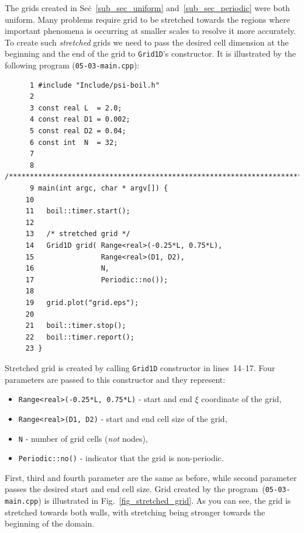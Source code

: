 The grids created in Sec\.~\ref{sub_sec_uniform} and~\ref{sub_sec_periodic}
were both uniform. Many problems require grid to be stretched towards
the regions where important phenomena is occurring at smaller scales to
resolve it more accurately. To create such {\em stretched} grids we need
to pass the desired cell dimension at the beginning and the end of the grid
to {\tt Grid1D}'s constructor. It is illustrated by the following program 
({\tt 05-03-main.cpp}):
%
{\small \begin{verbatim}
      1 #include "Include/psi-boil.h"
      2
      3 const real L  = 2.0;
      4 const real D1 = 0.002;
      5 const real D2 = 0.04;
      6 const int  N  = 32;
      7
      8 /****************************************************************************/
      9 main(int argc, char * argv[]) {
     10
     11   boil::timer.start();
     12
     13   /* stretched grid */
     14   Grid1D grid( Range<real>(-0.25*L, 0.75*L),
     15                Range<real>(D1, D2),
     16                N,
     17                Periodic::no());
     18
     19   grid.plot("grid.eps");
     20
     21   boil::timer.stop();
     22   boil::timer.report();
     23 }
\end{verbatim}}
%
Stretched grid is created by calling {\tt Grid1D} constructor in lines~14--17. 
Four parameters are passed to this constructor and they represent:
%
\begin{itemize}
  \item {\tt Range<real>(-0.25*L, 0.75*L)} - start and end $\xi$ coordinate of the grid,
  \item {\tt Range<real>(D1, D2)}          - start and end cell size of the grid,
  \item {\tt N}                            - number of grid cells ({\em not} nodes),
  \item {\tt Periodic::no()}               - indicator that the grid is non-periodic.
\end{itemize}
%
First, third and fourth parameter are the same as before, while second
parameter passes the desired start and end cell size. Grid created by
the program~({\tt 05-03-main.cpp}) is illustrated in Fig.~\ref{fig_stretched_grid}. 
As you can see, the grid is stretched towards both walls, with stretching
being stronger towards the beginning of the domain.


